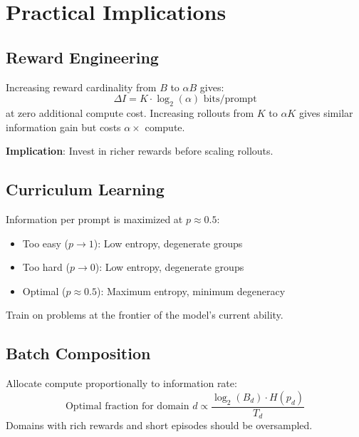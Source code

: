 \documentclass[11pt,a4paper]{article}
\theoremstyle{definition}
\theoremstyle{remark}
\begin{document}
\section{Practical Implications}

\subsection{Reward Engineering}

\begin{takeaway}
Increasing reward cardinality from $B$ to $\alpha B$ gives:
\[
\Delta I = K \cdot \log_2(\alpha) \text{ bits/prompt}
\]
at zero additional compute cost. Increasing rollouts from $K$ to $\alpha K$ gives similar information gain but costs $\alpha\times$ compute.

\textbf{Implication}: Invest in richer rewards before scaling rollouts.
\end{takeaway}

\subsection{Curriculum Learning}

\begin{takeaway}
Information per prompt is maximized at $p \approx 0.5$:
\begin{itemize}
    \item Too easy ($p \to 1$): Low entropy, degenerate groups
    \item Too hard ($p \to 0$): Low entropy, degenerate groups
    \item Optimal ($p \approx 0.5$): Maximum entropy, minimum degeneracy
\end{itemize}
Train on problems at the frontier of the model's current ability.
\end{takeaway}

\subsection{Batch Composition}

\begin{takeaway}
Allocate compute proportionally to information rate:
\[
\text{Optimal fraction for domain } d \propto \frac{\log_2(B_d) \cdot H(p_d)}{T_d}
\]
Domains with rich rewards and short episodes should be oversampled.
\end{takeaway}
\end{document}
